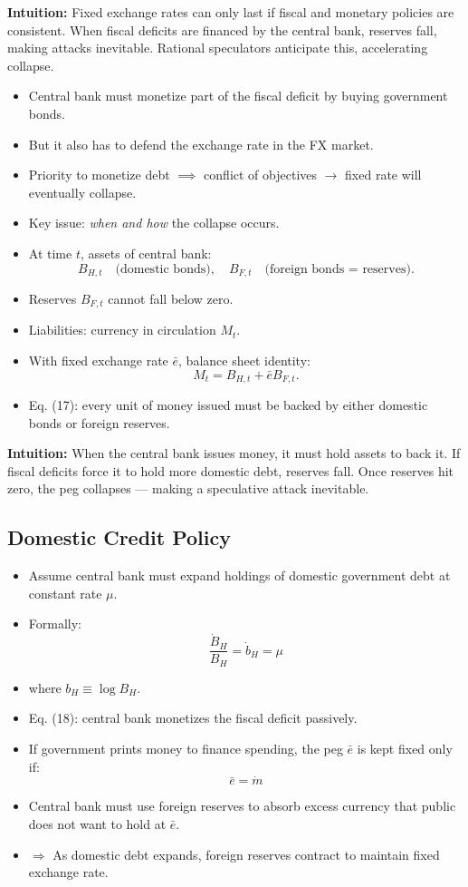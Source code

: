 \documentclass[12pt]{article}
\begin{document}
\noindent\textbf{Intuition:}  
Fixed exchange rates can only last if fiscal and monetary policies are consistent. When fiscal deficits are financed by the central bank, reserves fall, making attacks inevitable. Rational speculators anticipate this, accelerating collapse.

\begin{itemize}
    \item Central bank must monetize part of the fiscal deficit by buying government bonds.
    \item But it also has to defend the exchange rate in the FX market.
    \item Priority to monetize debt $\implies$ conflict of objectives $\to$ fixed rate will eventually collapse.
    \item Key issue: \textit{when and how} the collapse occurs.
    \item At time $t$, assets of central bank:
    \[
        B_{H,t} \quad \text{(domestic bonds)}, \quad B_{F,t} \quad \text{(foreign bonds = reserves)}.
    \]
    \item Reserves $B_{F,t}$ cannot fall below zero.
    \item Liabilities: currency in circulation $M_t$.
    \item With fixed exchange rate $\bar{e}$, balance sheet identity:
    \[
        M_t = B_{H,t} + \bar{e}B_{F,t}. \tag{17}
    \]
    \item Eq. (17): every unit of money issued must be backed by either domestic bonds or foreign reserves.
\end{itemize}

\noindent\textbf{Intuition:}  
When the central bank issues money, it must hold assets to back it. If fiscal deficits force it to hold more domestic debt, reserves fall. Once reserves hit zero, the peg collapses — making a speculative attack inevitable.

\subsection*{\noindent\textbf{Domestic Credit Policy}}

\begin{itemize}
    \item Assume central bank must expand holdings of domestic government debt at constant rate $\mu$.
    \item Formally:
    \[
        \frac{\dot{B}_H}{B_H} = \dot{b}_H = \mu \tag{18}
    \]
    \item where $b_H \equiv \log B_H$.
    \item Eq. (18): central bank monetizes the fiscal deficit passively.
    \item If government prints money to finance spending, the peg $\bar{e}$ is kept fixed only if:
    \[
        \bar{e} = \dot{m}
    \]
    \item Central bank must use foreign reserves to absorb excess currency that public does not want to hold at $\bar{e}$.
    \item $\Rightarrow$ As domestic debt expands, foreign reserves contract to maintain fixed exchange rate.
\end{itemize}
\end{document}
